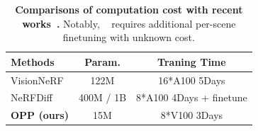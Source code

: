 
\begin{table}[t]
\setlength{\abovecaptionskip}{0cm}
    \footnotesize
     \caption{\textbf{Comparisons of computation cost with recent works~\cite{lin2023visionnerf,gu2023nerfdiff}.} Notably, ~\cite{gu2023nerfdiff} requires additional per-scene finetuning with unknown cost. }
    \label{tab:appendix_computationwithrecent}
    \centering
    \small
     \setlength\tabcolsep{8pt}
        \begin{tabular}{l|cc}
        \rowcolor[gray]{.9}
        \hline
        Methods    &  Param.   & Traning Time  \\ \hline \hline
        VisionNeRF~\cite{lin2023visionnerf}   & 122M  &  16*A100 5Days          \\
        NeRFDiff~\cite{gu2023nerfdiff}  & 400M / 1B &  8*A100 4Days + finetune    \\
        
        \textbf{OPP (ours)} & 15M & 8*V100  3Days \\ 
        \hline
        \end{tabular}
\end{table}